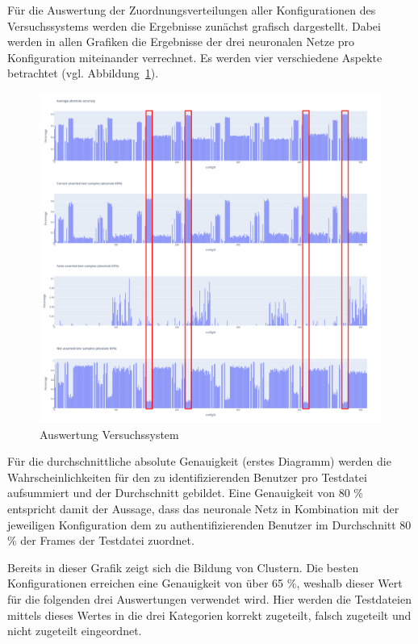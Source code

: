 Für die Auswertung der Zuordnungsverteilungen aller Konfigurationen des Versuchssystems werden die Ergebnisse zunächst grafisch dargestellt.
Dabei werden in allen Grafiken die Ergebnisse der drei neuronalen Netze pro Konfiguration miteinander verrechnet.
Es werden vier verschiedene Aspekte betrachtet (vgl. Abbildung~\ref{fig:AuswertungVersuchssystem}).
\begin{figure}[H]
    \centering
    \includegraphics[width=1\textwidth, keepaspectratio]{images/Auswertung.png}
    \caption{Auswertung Versuchssystem}
    \label{fig:AuswertungVersuchssystem}
\end{figure}

Für die durchschnittliche absolute Genauigkeit (erstes Diagramm) werden die Wahrscheinlichkeiten für den zu identifizierenden Benutzer pro Testdatei aufsummiert und der Durchschnitt gebildet.
Eine Genauigkeit von 80 \% entspricht damit der Aussage, dass das neuronale Netz in Kombination mit der jeweiligen Konfiguration dem zu authentifizierenden Benutzer im Durchschnitt 80 \% der Frames der Testdatei zuordnet.

Bereits in dieser Grafik zeigt sich die Bildung von Clustern.
Die besten Konfigurationen erreichen eine Genauigkeit von über 65 \%, weshalb dieser Wert für die folgenden drei Auswertungen verwendet wird.
Hier werden die Testdateien mittels dieses Wertes in die drei Kategorien korrekt zugeteilt, falsch zugeteilt und nicht zugeteilt eingeordnet.

